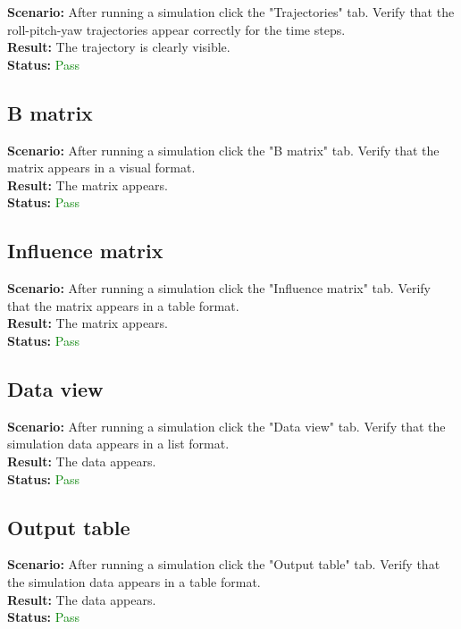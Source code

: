 \documentclass[a4paper, 11pt, article]{report}
\begin{document}
\noindent \textbf{Scenario:} After running a simulation click the "Trajectories" tab. Verify that the roll-pitch-yaw trajectories appear correctly for the time steps.
\\
\noindent \textbf{Result:} The trajectory is clearly visible.
\\
\noindent \textbf{Status:} \textcolor{green}{Pass}

\subsection{B matrix}

\noindent \textbf{Scenario:} After running a simulation click the "B matrix" tab. Verify that the matrix appears in a visual format.
\\
\noindent \textbf{Result:} The matrix appears.
\\
\noindent \textbf{Status:} \textcolor{green}{Pass}

\subsection{Influence matrix}

\noindent \textbf{Scenario:} After running a simulation click the "Influence matrix" tab. Verify that the matrix appears in a table format.
\\
\noindent \textbf{Result:} The matrix appears.
\\
\noindent \textbf{Status:} \textcolor{green}{Pass}

\subsection{Data view}

\noindent \textbf{Scenario:} After running a simulation click the "Data view" tab. Verify that the simulation data appears in a list format.
\\
\noindent \textbf{Result:} The data appears.
\\
\noindent \textbf{Status:} \textcolor{green}{Pass}

\subsection{Output table}

\noindent \textbf{Scenario:} After running a simulation click the "Output table" tab. Verify that the simulation data appears in a table format.
\\
\noindent \textbf{Result:} The data appears.
\\
\noindent \textbf{Status:} \textcolor{green}{Pass}
\end{document}
